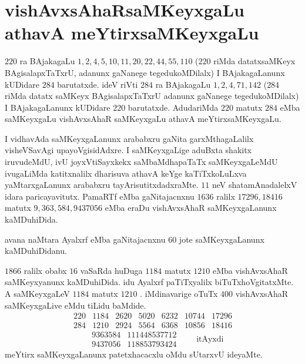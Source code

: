\chapter{vishAvxsAhaRsaMKeyxgaLu athavA meYtirxsaMKeyxgaLu}
\vskip -20pt

$220$ ra BAjakagaLu $1,2,4,5,10,11,20,22,44,55,110$ ($220$ riMda datatxsaMKeyx BAgisalapxTaTxrU, adanunx gaNanege tegedukoMDilalx) I BAjakagaLanunx kUDidare $284$ barutatxde. ideV riVti $284$ ra BAjakagaLu $1,2,4,71,142$ ($284$ riMda datatx saMKeyx BAgisalapxTaTxrU adanunx gaNanege tegedukoMDilalx) I BAjakagaLanunx kUDidare $220$ barutatxde. AdudariMda $220$ matutx $284$ eMba saMKeyxgaLu vishAvxsAhaR saMKeyxgaLu athavA meYtirxsaMKeyxgaLu.

I vidhavAda saMKeyxgaLanunx arababxru gaNita garxMthagaLalilx visheVSavAgi upa\-yoVgisidAdxre. I saMKeyxgaLige aduBxta shakitx iruvudeMdU, ivU joyxVtiSayxkekx saMbaMdhapaTaTx saMKeyxgaLeMdU ivugaLiMda katitxnalilx dharisuva athavA keYge kaTiTxkoLuLxva yaMtarxgaLanunx arababxru tayArisutitxdadxraMte. $11$ neV shatamAnadalelxV idara paricayavitutx. PamaRTf eMba gaNitajacnxnu $1636$ ralilx $17296, 18416$ matutx $9,363,584,9437056$  eMba eraDu vishAvxsAhaR saMKeyxgaLanunx kaMDuhiDida.

avana naMtara Ayalxrf eMba gaNitajacnxnu $60$ jote saMKeyxgaLanunx kaMDuhiDidanu.

$1866$ ralilx obabx $16$ vaSaRda huDuga $1184$ matutx $1210$ eMba vishAvxsAhaR saMKeyxyanunx kaMDuhiDida. idu Ayalxrf paTiTxyalilx biTuTxhoVgitatxMte. A saMKeyxgaLeV $1184$ matutx $1210$ . iMdinavarige oTuTx $400$ vishAvxsAhaR saMKeyxgaLive eMdu tiLidu baMdide. 
{\fontsize{10}{12}\selectfont
$$
\begin{matrix}
220 & 1184 & 2620 & 5020 & 6232 & 10744 & 17296\\ 
284 & 1210 & 2924 & 5564 & 6368 & 10856 & 18416 
\end{matrix}
$$
$$
\begin{matrix}
& 9363584 & 111448537712 \\
& 9437056 & 118853793424 
\end{matrix}
\qquad \text{itAyxdi} 
$$}
meYtirx saMKeyxgaLanunx patetxhacacxlu oMdu sUtarxvU ideyaMte.
